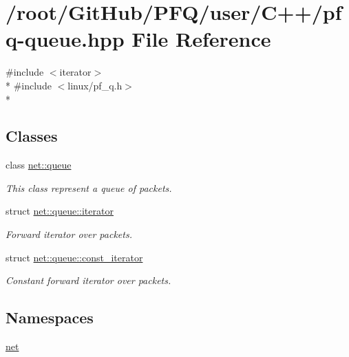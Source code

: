 \hypertarget{pfq-queue_8hpp}{\section{/root/\-Git\-Hub/\-P\-F\-Q/user/\-C++/pfq-\/queue.hpp File Reference}
\label{pfq-queue_8hpp}
}
{\ttfamily \#include $<$iterator$>$}\\*
{\ttfamily \#include $<$linux/pf\-\_\-q.\-h$>$}\\*
\subsection*{Classes}
\begin{DoxyCompactItemize}
\item 
class \hyperlink{classnet_1_1queue}{net\-::queue}
\begin{DoxyCompactList}\small\item\em This class represent a queue of packets. \end{DoxyCompactList}\item 
struct \hyperlink{structnet_1_1queue_1_1iterator}{net\-::queue\-::iterator}
\begin{DoxyCompactList}\small\item\em Forward iterator over packets. \end{DoxyCompactList}\item 
struct \hyperlink{structnet_1_1queue_1_1const__iterator}{net\-::queue\-::const\-\_\-iterator}
\begin{DoxyCompactList}\small\item\em Constant forward iterator over packets. \end{DoxyCompactList}\end{DoxyCompactItemize}
\subsection*{Namespaces}
\begin{DoxyCompactItemize}
\item 
\hyperlink{namespacenet}{net}
\end{DoxyCompactItemize}
